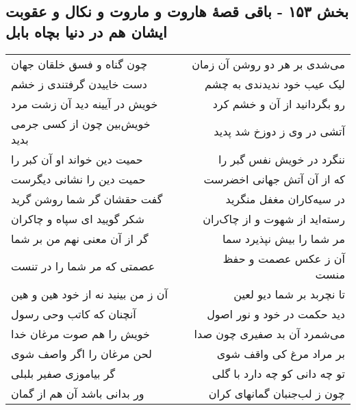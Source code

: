 \begin{center}
\section*{بخش ۱۵۳ - باقی قصهٔ هاروت و ماروت و نکال و عقوبت ایشان هم در دنیا بچاه بابل}
\label{sec:sh153}
\begin{longtable}{l p{0.5cm} r}
چون گناه و فسق خلقان جهان
&&
می‌شدی بر هر دو روشن آن زمان
\\
دست خاییدن گرفتندی ز خشم
&&
لیک عیب خود ندیدندی به چشم
\\
خویش در آیینه دید آن زشت مرد
&&
رو بگردانید از آن و خشم کرد
\\
خویش‌بین چون از کسی جرمی بدید
&&
آتشی در وی ز دوزخ شد پدید
\\
حمیت دین خواند او آن کبر را
&&
ننگرد در خویش نفس گبر را
\\
حمیت دین را نشانی دیگرست
&&
که از آن آتش جهانی اخضرست
\\
گفت حقشان گر شما روشن گرید
&&
در سیه‌کاران مغفل منگرید
\\
شکر گویید ای سپاه و چاکران
&&
رسته‌اید از شهوت و از چاک‌ران
\\
گر از آن معنی نهم من بر شما
&&
مر شما را بیش نپذیرد سما
\\
عصمتی که مر شما را در تنست
&&
آن ز عکس عصمت و حفظ منست
\\
آن ز من بینید نه از خود هین و هین
&&
تا نچربد بر شما دیو لعین
\\
آنچنان که کاتب وحی رسول
&&
دید حکمت در خود و نور اصول
\\
خویش را هم صوت مرغان خدا
&&
می‌شمرد آن بد صفیری چون صدا
\\
لحن مرغان را اگر واصف شوی
&&
بر مراد مرغ کی واقف شوی
\\
گر بیاموزی صفیر بلبلی
&&
تو چه دانی کو چه دارد با گلی
\\
ور بدانی باشد آن هم از گمان
&&
چون ز لب‌جنبان گمانهای کران
\\
\end{longtable}
\end{center}
